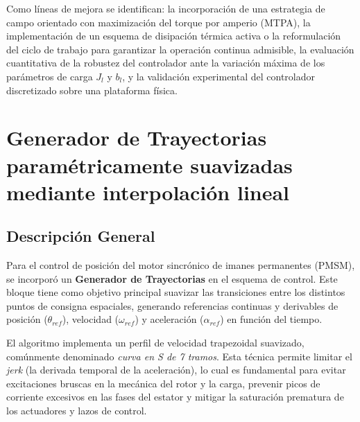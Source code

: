 \documentclass[12pt, a4paper,journal, onecolumn, compsoc]{IEEEtran}
\begin{document}
Como líneas de mejora se identifican: la incorporación de una estrategia de campo orientado con maximización del torque por amperio (MTPA), la implementación de un esquema de disipación térmica activa o la reformulación del ciclo de trabajo para garantizar la operación continua admisible, la evaluación cuantitativa de la robustez del controlador ante la variación máxima de los parámetros de carga $J_l$ y $b_l$, y la validación experimental del controlador discretizado sobre una plataforma física.











\appendices
\section{Generador de Trayectorias paramétricamente suavizadas mediante interpolación lineal}
\subsection{Descripción General}
Para el control de posición del motor sincrónico de imanes permanentes (PMSM), se incorporó un \textbf{Generador de Trayectorias} en el esquema de control. Este bloque tiene como objetivo principal suavizar las transiciones entre los distintos puntos de consigna espaciales, generando referencias continuas y derivables de posición ($\theta_{ref}$), velocidad ($\omega_{ref}$) y aceleración ($\alpha_{ref}$) en función del tiempo. 

El algoritmo implementa un perfil de velocidad trapezoidal suavizado, comúnmente denominado \textit{curva en S de 7 tramos}. Esta técnica permite limitar el \textit{jerk} (la derivada temporal de la aceleración), lo cual es fundamental para evitar excitaciones bruscas en la mecánica del rotor y la carga, prevenir picos de corriente excesivos en las fases del estator y mitigar la saturación prematura de los actuadores y lazos de control.
\end{document}
